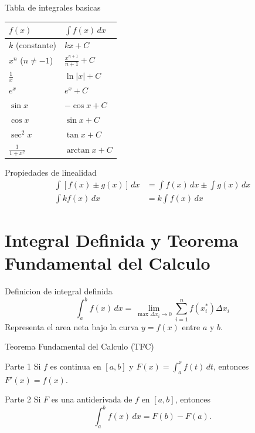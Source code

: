 \documentclass[aspectratio=169, 10pt, xcolor=table]{beamer}
\begin{document}
\begin{frame}{Tabla de integrales basicas}
    \begin{table}
        \centering
        \begin{tabular}{l|l}
            \toprule
            $f(x)$ & $\int f(x)\,dx$ \\
            \midrule
            $k$ (constante) & $kx + C$ \\
            $x^n$ ($n\neq -1$) & $\frac{x^{n+1}}{n+1}+C$ \\
            $\frac{1}{x}$ & $\ln|x|+C$ \\
            $e^x$ & $e^x+C$ \\
            $\sin x$ & $-\cos x+C$ \\
            $\cos x$ & $\sin x+C$ \\
            $\sec^2 x$ & $\tan x+C$ \\
            $\frac{1}{1+x^2}$ & $\arctan x+C$ \\
            \bottomrule
        \end{tabular}
    \end{table}
\end{frame}

\begin{frame}{Propiedades de linealidad}
    \[
    \begin{aligned}
        \int [f(x)\pm g(x)]\,dx &= \int f(x)\,dx \pm \int g(x)\,dx \\
        \int k f(x)\,dx &= k\int f(x)\,dx
    \end{aligned}
    \]
\end{frame}

\section{Integral Definida y Teorema Fundamental del Calculo}

\begin{frame}{Definicion de integral definida}
    \[
    \int_a^b f(x)\,dx = \lim_{\max\Delta x_i\to 0} \sum_{i=1}^n f(x_i^*)\Delta x_i
    \]
    Representa el area neta bajo la curva $y=f(x)$ entre $a$ y $b$.
\end{frame}

\begin{frame}{Teorema Fundamental del Calculo (TFC)}
    \begin{block}{Parte 1}
        Si $f$ es continua en $[a,b]$ y $F(x)=\int_a^x f(t)\,dt$, entonces $F'(x)=f(x)$.
    \end{block}
    \begin{block}{Parte 2}
        Si $F$ es una antiderivada de $f$ en $[a,b]$, entonces
        \[
        \int_a^b f(x)\,dx = F(b)-F(a).
        \]
    \end{block}
\end{frame}
\end{document}
